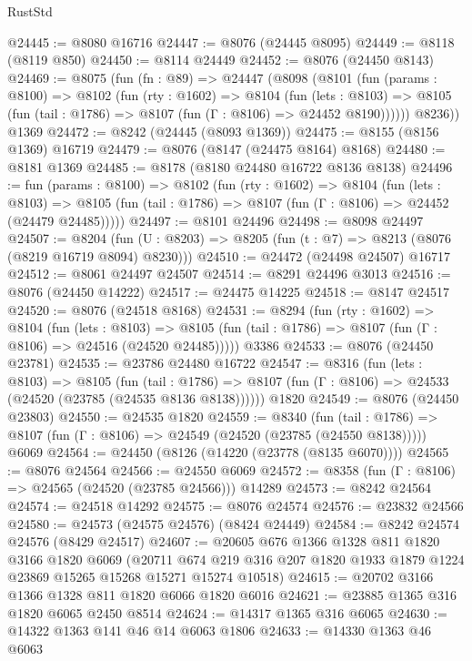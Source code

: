 \begin{lexlean}{RustStd}
\begin{coremodule}
@24445 := @8080 @16716
@24447 := @8076 (@24445 @8095)
@24449 := @8118 (@8119 @850)
@24450 := @8114 @24449
@24452 := @8076 (@24450 @8143)
@24469 := @8075
    (fun (fn : @89) =>
    @24447
      (@8098
        (@8101
          (fun (params : @8100) =>
          @8102
            (fun (rty : @1602) =>
            @8104
              (fun (lets : @8103) =>
              @8105 (fun (tail : @1786) => @8107 (fun (Γ : @8106) => @24452 @8190))))))
        @8236))
    @1369
@24472 := @8242 (@24445 (@8093 @1369))
@24475 := @8155 (@8156 @1369) @16719
@24479 := @8076 (@8147 (@24475 @8164) @8168)
@24480 := @8181 @1369
@24485 := @8178 (@8180 @24480 @16722 @8136 @8138)
@24496 := fun (params : @8100) =>
  @8102
    (fun (rty : @1602) =>
    @8104
      (fun (lets : @8103) =>
      @8105 (fun (tail : @1786) => @8107 (fun (Γ : @8106) => @24452 (@24479 @24485)))))
@24497 := @8101 @24496
@24498 := @8098 @24497
@24507 := @8204
    (fun (U : @8203) => @8205 (fun (t : @7) => @8213 (@8076 (@8219 @16719 @8094) @8230)))
@24510 := @24472 (@24498 @24507) @16717
@24512 := @8061 @24497 @24507
@24514 := @8291 @24496 @3013
@24516 := @8076 (@24450 @14222)
@24517 := @24475 @14225
@24518 := @8147 @24517
@24520 := @8076 (@24518 @8168)
@24531 := @8294
    (fun (rty : @1602) =>
    @8104
      (fun (lets : @8103) =>
      @8105 (fun (tail : @1786) => @8107 (fun (Γ : @8106) => @24516 (@24520 @24485)))))
    @3386
@24533 := @8076 (@24450 @23781)
@24535 := @23786 @24480 @16722
@24547 := @8316
    (fun (lets : @8103) =>
    @8105
      (fun (tail : @1786) =>
      @8107 (fun (Γ : @8106) => @24533 (@24520 (@23785 (@24535 @8136 @8138))))))
    @1820
@24549 := @8076 (@24450 @23803)
@24550 := @24535 @1820
@24559 := @8340
    (fun (tail : @1786) => @8107 (fun (Γ : @8106) => @24549 (@24520 (@23785 (@24550 @8138)))))
    @6069
@24564 := @24450 (@8126 (@14220 (@23778 (@8135 @6070))))
@24565 := @8076 @24564
@24566 := @24550 @6069
@24572 := @8358 (fun (Γ : @8106) => @24565 (@24520 (@23785 @24566))) @14289
@24573 := @8242 @24564
@24574 := @24518 @14292
@24575 := @8076 @24574
@24576 := @23832 @24566
@24580 := @24573 (@24575 @24576) (@8424 @24449)
@24584 := @8242 @24574 @24576 (@8429 @24517)
@24607 := @20605
    @676
    @1366
    @1328
    @811
    @1820
    @3166
    @1820
    @6069
    (@20711 @674 @219 @316 @207 @1820 @1933 @1879 @1224 @23869 @15265 @15268 @15271 @15274 @10518)
@24615 := @20702 @3166 @1366 @1328 @811 @1820 @6066 @1820 @6016
@24621 := @23885 @1365 @316 @1820 @6065 @2450 @8514
@24624 := @14317 @1365 @316 @6065
@24630 := @14322 @1363 @141 @46 @14 @6063 @1806
@24633 := @14330 @1363 @46 @6063

\end{coremodule}
\end{lexlean}
